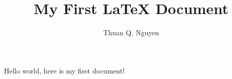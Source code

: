 \documentclass{article}
\begin{document}
\title{My First \LaTeX{} Document}
\author{Thuan Q. Nguyen}
\maketitle

Hello world, here is my first document!
\end{document}
